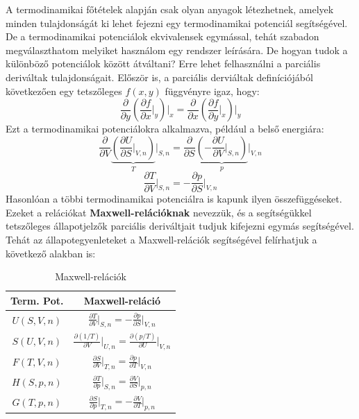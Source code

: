 \documentclass[a4paper,12pt]{article}
\begin{document}
A termodinamikai főtételek alapján csak olyan anyagok létezhetnek, amelyek minden tulajdonságát ki lehet fejezni egy termodinamikai potenciál segítségével. De a termodinamikai potenciálok
ekvivalensek egymással, tehát szabadon megválaszthatom melyiket használom egy rendszer leírására.
\newline
\newline
De hogyan tudok a különböző potenciálok között átváltani? Erre lehet felhasználni a parciális deriváltak tulajdonságait.
Először is, a parciális derviáltak definíciójából következően egy tetszőleges $f(x,y)$ függvényre igaz, hogy:
\begin{equation}
    \frac{\partial}{\partial y} \left(\frac{\partial f}{\partial x}\bigg|_y\right)\bigg|_x = \frac{\partial}{\partial x} \left(\frac{\partial f}{\partial y}\bigg|_x\right)\bigg|_y
\end{equation}
Ezt a termodinamikai potenciálokra alkalmazva, például a belső energiára:
\begin{equation}
    \frac{\partial}{\partial V} \underbrace{\left(\frac{\partial U}{\partial S}\bigg|_{V,n}\right)}_{T}\bigg|_{S,n} = \frac{\partial}{\partial S} \underbrace{\left(-\frac{\partial U}{\partial V}\bigg|_{S,n}\right)}_{p}\bigg|_{V,n}
\end{equation}
\begin{equation}
    \frac{\partial T}{\partial V}\bigg|_{S,n} = - \frac{\partial p}{\partial S}\bigg|_{V,n}
\end{equation}
Hasonlóan a többi termodinamikai potenciálra is kapunk ilyen összefüggéseket. Ezeket a relációkat \textbf{Maxwell-relációknak} nevezzük, és
a segítségükkel tetszőleges állapotjelzők parciális deriváltjait tudjuk kifejezni egymás segítségével. Tehát az állapotegyenleteket a Maxwell-relációk segítségével
felírhatjuk a következő alakban is:
\begin{table}[H]
    \centering
    \begin{tabular}{|c|c|}
        \hline
        Term. Pot. & Maxwell-reláció \\
        \hline
        $U(S, V, n)$ & $\frac{\partial T}{\partial V}\big|_{S,n} = - \frac{\partial p}{\partial S}\big|_{V,n}$ \\
        \hline
        $S(U, V, n)$ & $\frac{\partial (1/T)}{\partial V}\big|_{U,n} = \frac{\partial (p/T)}{\partial U}\big|_{V,n}$ \\
        \hline
        $F(T, V, n)$ & $\frac{\partial S}{\partial V}\big|_{T,n} = \frac{\partial p}{\partial T}\big|_{V,n}$ \\
        \hline
        $H(S, p, n)$ & $\frac{\partial T}{\partial p}\big|_{S,n} = \frac{\partial V}{\partial S}\big|_{p,n}$ \\
        \hline
        $G(T, p, n)$ & $\frac{\partial S}{\partial p}\big|_{T,n} = - \frac{\partial V}{\partial T}\big|_{p,n}$ \\
        \hline
    \end{tabular}
    \caption{Maxwell-relációk}
\end{table}
\end{document}
